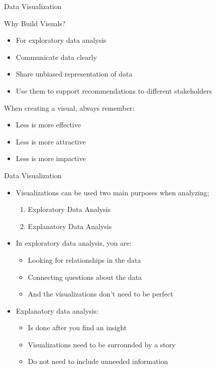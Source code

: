 \documentclass[12pt]{beamer}
\begin{document}
    \begin{frame}{Data Visualization}
    	\begin{block}{Why Build Visuals?}
    		\begin{itemize}
    			\item For exploratory data analysis
    			\item Communicate data clearly
    			\item Share unbiased representation of data
    			\item Use them to support recommendations to different stakeholders
    		\end{itemize}
    	\end{block}
    	\begin{block}{When creating a visual, always remember:}
    		\begin{itemize}
    			\item Less is more effective
    			\item Less is more attractive
    			\item Less is more impactive
    		\end{itemize}
    	\end{block}
    \end{frame}
    \begin{frame}{Data Visualization}
    	\begin{itemize}
    		\item Visualizations can be used two main purposes when analyzing;
    		\begin{enumerate}
    			\item Exploratory Data Analysis
    			\item Explanatory Data Analysis
    		\end{enumerate}
    	\item In exploratory data analysis, you are:
    	\begin{itemize}
    		\item Looking for relationships in the data
    		\item Connecting questions about the data
    		\item And the visualizations don't need to be perfect
    	\end{itemize}
        \item Explanatory data analysis:
              \begin{itemize}
              	\item  Is done after you find an insight
              	\item Visualizations need to be surrounded by a story
              	\item Do not need to include unneeded information
              \end{itemize}
              
    	\end{itemize}
    \end{frame}
\end{document}
